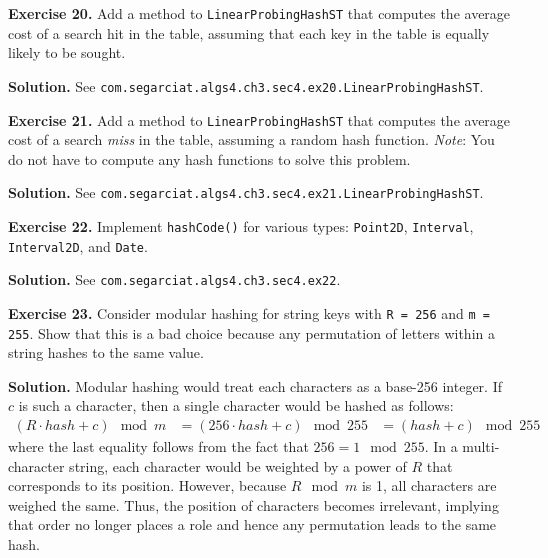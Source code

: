 \documentclass[12pt, a4paper]{article}
\newenvironment{ex}[2][Exercise]
{\par\medskip\noindent \textbf{#1 #2.}}
{\medskip}
\newenvironment{sol}[1][Solution]
{\par\medskip\noindent \textbf{#1.} }
{\medskip}
\begin{document}
	\begin{ex}{20}
		Add a method to \texttt{LinearProbingHashST} that computes the average cost of a search hit
		in the table, assuming that each key in the table is equally likely to be sought.
	\end{ex}
	\begin{sol}
		See \texttt{com.segarciat.algs4.ch3.sec4.ex20.LinearProbingHashST}.
	\end{sol}
	\begin{ex}{21}
		Add a method to \texttt{LinearProbingHashST} that computes the average cost of a search \emph{miss}
		in the table, assuming a random hash function. \emph{Note}: You do not have to compute any hash
		functions to solve this problem.
	\end{ex}
	\begin{sol}
		See \texttt{com.segarciat.algs4.ch3.sec4.ex21.LinearProbingHashST}.
	\end{sol}
	\begin{ex}{22}
		Implement \texttt{hashCode()} for various types: \texttt{Point2D}, \texttt{Interval},
		\texttt{Interval2D}, and \texttt{Date}.
	\end{ex}
	\begin{sol}
		See \texttt{com.segarciat.algs4.ch3.sec4.ex22}.
	\end{sol}
	\begin{ex}{23}
		Consider modular hashing for string keys with \texttt{R = 256} and \texttt{m = 255}.
		Show that this is a bad choice because any permutation of letters within a string
		hashes to the same value.
	\end{ex}
	\begin{sol}
		Modular hashing would treat each characters as a base-256 integer. If $c$ is such
		a character, then a single character would be hashed as follows:
		\begin{align*}
			(R \cdot hash + c) \mod m&=(256\cdot hash + c)\mod 255&=(hash + c)\mod 255
		\end{align*}
		where the last equality follows from the fact that $256=1\mod 255$.
		In a multi-character string, each character would be weighted by a power of $R$ that
		corresponds to its position. However, because $R\mod m$ is 1, all characters
		are weighed the same. Thus, the position of characters becomes irrelevant,
		implying that order no longer places a role and hence any permutation leads
		to the same hash.
	\end{sol}
	\pagebreak
	\printbibliography
\end{document}
